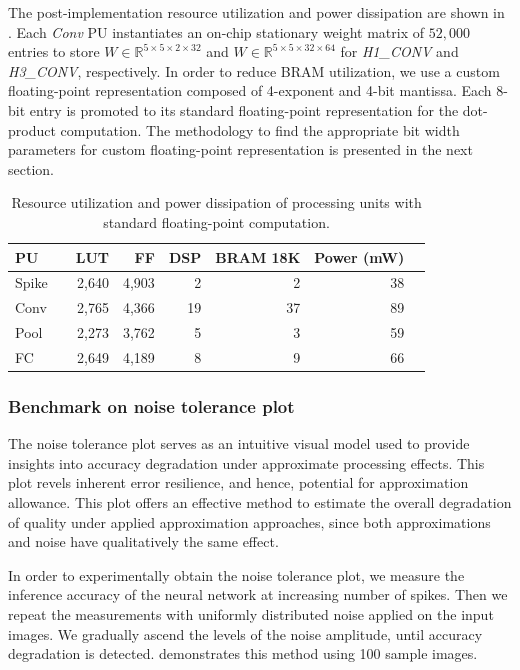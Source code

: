 The post-implementation resource utilization and power dissipation are shown in . Each \emph{Conv} PU instantiates an on-chip stationary weight matrix of $52,000$ entries to store $W\in\mathbb{R}^{5\times 5\times 2\times 32}$ and $W\in\mathbb{R}^{5\times 5\times 32\times 64}$ for \emph{H1\_CONV} and \emph{H3\_CONV}, respectively. In order to reduce BRAM utilization, we use a custom floating-point representation composed of 4-exponent and 4-bit mantissa. Each 8-bit entry is promoted to its standard floating-point representation for the dot-product computation. The methodology to find the appropriate bit width parameters for custom floating-point representation is presented in the next section.

\begin{table}[!h]\centering
	\caption{Resource utilization and power dissipation of processing units with standard floating-point computation.}\label{tab:resource_fp}
	\scriptsize
	\begin{tabular}{lrrrrrrr}\toprule
		\textbf{PU} & &\textbf{LUT} &\textbf{FF} &\textbf{DSP} &\textbf{BRAM 18K} &\textbf{Power (mW)} \\\midrule
		Spike & &2,640 &4,903 &2 &2 &38 \\
		Conv & &2,765 &4,366 &19 &37 &89 \\
		Pool & &2,273 &3,762 &5 &3 &59 \\
		FC & &2,649 &4,189 &8 &9 &66 \\
		\bottomrule
	\end{tabular}
\end{table}

\subsubsection{Benchmark on noise tolerance plot}
The noise tolerance plot serves as an intuitive visual model used to provide insights into accuracy degradation under approximate processing effects. This plot revels inherent error resilience, and hence, potential for approximation allowance. This plot offers an effective method to estimate the overall degradation of quality under applied approximation approaches, since both approximations and noise have qualitatively the same effect\cite{venkataramani2015approximate}.

In order to experimentally obtain the noise tolerance plot, we measure the inference accuracy of the neural network at increasing number of spikes. Then we repeat the measurements with uniformly distributed noise applied on the input images. We gradually ascend the levels of the noise amplitude, until accuracy degradation is detected.  demonstrates this method using 100 sample images.

